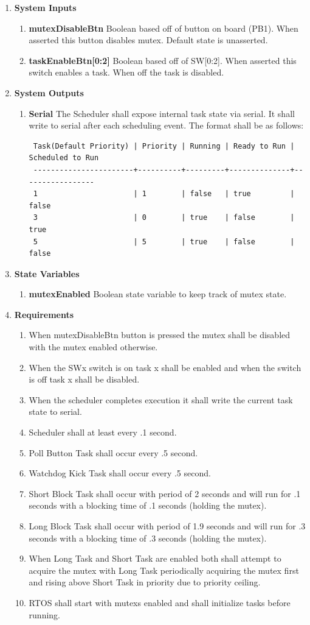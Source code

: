 \documentclass{article}
\newcommand{\bitem}[1]{\item \textbf{#1}}
\begin{document}
\begin{enumerate}
\bitem{System Inputs}
	\begin{enumerate}
	\bitem{mutexDisableBtn} Boolean based off of button on board (PB1). When asserted this button disables mutex. Default state is unasserted.
	\bitem{taskEnableBtn[0:2]} Boolean based off of SW[0:2]. When asserted this switch enables a task. When off the task is disabled.
	\end{enumerate}
\bitem{System Outputs}
	\begin{enumerate}
	\bitem{Serial} The Scheduler shall expose internal task state via serial. It shall write to serial after each scheduling event. The format shall be as follows:
\begin{verbatim}
 Task(Default Priority) | Priority | Running | Ready to Run | Scheduled to Run
 -----------------------+----------+---------+--------------+-----------------
 1                      | 1        | false   | true         | false
 3                      | 0        | true    | false        | true
 5                      | 5        | true    | false        | false
\end{verbatim}
	\end{enumerate}
\bitem{State Variables}
	\begin{enumerate}
	\bitem{mutexEnabled} Boolean state variable to keep track of mutex state.
	\end{enumerate}
\bitem{Requirements}
	\begin{enumerate}
	\item When mutexDisableBtn button is pressed the mutex shall be disabled with the mutex enabled otherwise.
	\item When the SWx switch is on task x shall be enabled and when the switch is off task x shall be disabled.
	\item When the scheduler completes execution it shall write the current task state to serial.
	\item Scheduler shall at least every .1 second.
	\item Poll Button Task shall occur every .5 second.
	\item Watchdog Kick Task shall occur every .5 second.
	\item Short Block Task shall occur with period of 2 seconds and will run for .1 seconds with a blocking time of .1 seconds (holding the mutex).	
	\item Long Block Task shall occur with period of 1.9 seconds and will run for .3 seconds with a blocking time of .3 seconds (holding the mutex).
	\item When Long Task and Short Task are enabled both shall attempt to acquire the mutex with Long Task periodically acquiring the mutex first and rising above Short Task in priority due to priority ceiling.
	\item RTOS shall start with mutexs enabled and shall initialize tasks before running.
	\end{enumerate}
\end{enumerate}
\end{document}
